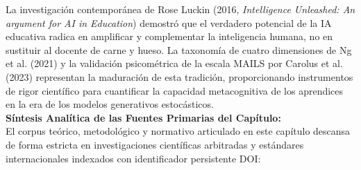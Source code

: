 La investigación contemporánea de Rose Luckin (2016, \textit{Intelligence Unleashed: An argument for AI in Education}) demostró que el verdadero potencial de la IA educativa radica en amplificar y complementar la inteligencia humana, no en sustituir al docente de carne y hueso. La taxonomía de cuatro dimensiones de Ng et al. (2021) y la validación psicométrica de la escala MAILS por Carolus et al. (2023) representan la maduración de esta tradición, proporcionando instrumentos de rigor científico para cuantificar la capacidad metacognitiva de los aprendices en la era de los modelos generativos estocásticos.\\[0.4cm]

\textbf{Síntesis Analítica de las Fuentes Primarias del Capítulo:}\\[0.2cm]
El corpus teórico, metodológico y normativo articulado en este capítulo descansa de forma estricta en investigaciones científicas arbitradas y estándares internacionales indexados con identificador persistente DOI:
